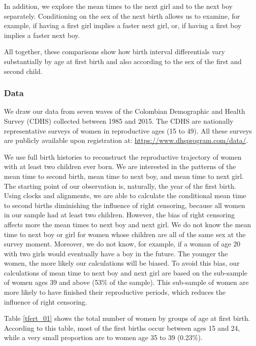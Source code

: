 \documentclass{article}
\begin{document}
 In addition, we explore the mean times to the next girl and to the next boy separately. Conditioning on the sex of the next birth allows us to examine, for example, if having a first girl implies a faster next girl, or, if having a first boy implies a faster next boy. 
 
 All together, these comparisons show how birth interval differentials vary substantially by age at first birth and also according to the sex of the first and second child.
 
\subsubsection{Data}

We draw our data from seven waves of the Colombian Demographic and Health Survey (CDHS) collected between 1985 and 2015. The CDHS are nationally representative surveys of women in reproductive ages (15 to 49). All these surveys are publicly available upon registration at: \url{https://www.dhsprogram.com/data/}.

We use full birth histories to reconstruct the reproductive trajectory of women with at least two children ever born. We are interested in the patterns of the mean time to second birth, mean time to next boy, and mean time to next girl. The starting point of our observation is, naturally, the year of the first birth. Using clocks and alignments, we are able to calculate the conditional mean time to second births diminishing the influence of right censoring, because all women in our sample had at least two children. However, the bias of right censoring affects more the mean times to next boy and next girl. We do not know the mean time to next boy or girl for women whose children are all of the same sex at the survey moment. Moreover, we do not know, for example, if a woman of age 20 with two girls would eventually have a boy in the future. The younger the women, the more likely our calculations will be biased. To avoid this bias, our calculations of mean time to next boy and next girl are based on the sub-sample of women ages 39 and above (53\% of the sample). This sub-sample of women are more likely to have finished their reproductive periods, which reduces the influence of right censoring.

Table \ref{tfert_01} shows the total number of women by groups of age at first birth. According to this table, most of the first births occur between ages 15 and 24, while a very small proportion are to women age 35 to 39 (0.23\%). 
\end{document}
